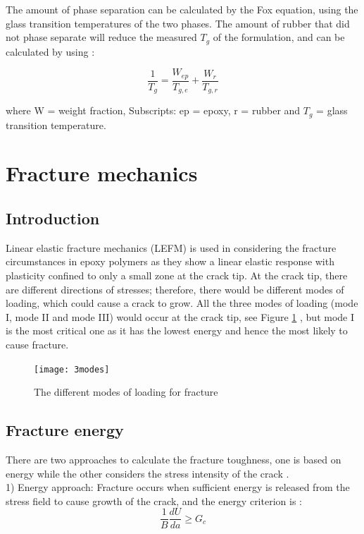 \documentclass[numbers=noendperiod,chapterprefix=on]{icldt} %
\begin{document}
The amount of phase separation can be calculated by the Fox equation, using the glass transition temperatures of the two phases. The amount of rubber that did not phase separate will reduce the measured $ T_{g} $ of the formulation, and can be calculated by using \cite{Chong2015}:

\begin{equation} 
\frac{1}{T_g} =\frac{W_{ep}}{T_{g,e}}+\frac{W_r}{T_{g,r}} 
\end{equation}

where W = weight fraction,
Subscripts: ep = epoxy, r = rubber
and $T_{g}$ = glass transition temperature.

\section{Fracture mechanics}

\subsection{Introduction}
Linear elastic fracture mechanics (LEFM) is used in considering the fracture circumstances in epoxy polymers as they show a linear elastic response with plasticity confined to only a small zone at the crack tip.
At the crack tip, there are different directions of stresses; therefore, there would be different modes of loading, which could cause a crack to grow. All the three modes of loading (mode I, mode II and mode III) would occur at the crack tip, see Figure \ref{3modes} \cite{Bandyopadhyay1990a}, but mode I is the most critical one as it has the lowest energy and hence the most likely to cause fracture. 
\begin{figure}[!htpb]
\centering
\texttt{[image: 3modes]} 
\caption{The different modes of loading for fracture \cite{Hodgkin1998}} \label{3modes}
\end{figure}

\subsection{Fracture energy}
There are two approaches to calculate the fracture toughness, one is based on energy while the other considers the stress intensity of the crack \cite{Giannakopoulos2011}. \\
1) Energy approach: Fracture occurs when sufficient energy is released from the stress field to cause growth of the crack, and the energy criterion is \cite{Chong2015}:
\begin{equation} \label{Energy criterion}
\frac{1}{B} \frac{dU}{da} \geq G_c 
\end{equation}
\end{document}
